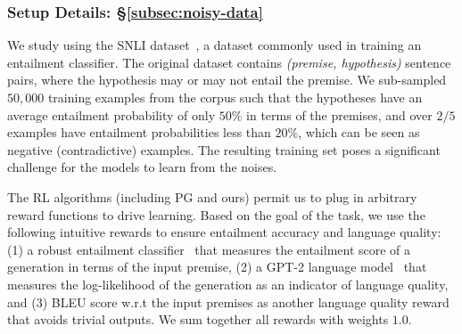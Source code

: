 \subsubsection{Setup Details: \S\ref{subsec:noisy-data}}
\label{appendix-subsubsec:setup-noisy-data}
We study using the SNLI dataset~\citep{bowman2015large}, a dataset commonly used in training an entailment classifier. 
The original dataset contains \emph{(premise, hypothesis)} sentence pairs, where the hypothesis may or may not entail the premise. 
We sub-sampled $50,000$ training examples from the corpus such that the hypotheses have an average entailment probability of only $50\%$ in terms of the premises, and over $2/5$ examples have entailment probabilities less than $20\%$, which can be seen as negative (contradictive) examples. The resulting training set poses a significant challenge for the models to learn from the noises.


The RL algorithms (including PG and ours) permit us to plug in arbitrary reward functions to drive learning. Based on the goal of the task, we use the following intuitive rewards to ensure entailment accuracy and language quality: (1) a robust entailment classifier~\citep{nie2020adversarial} that measures the entailment score of a generation in terms of the input premise, (2) a GPT-2 language model~\citep{radford2019language} that measures the log-likelihood of the generation as an indicator of language quality, and (3) BLEU score w.r.t the input premises as another language quality reward that avoids trivial outputs. We sum together all rewards with weights $1.0$.
